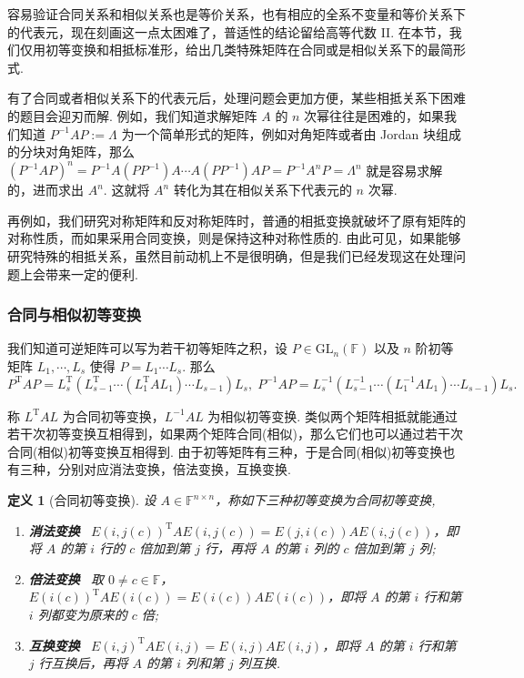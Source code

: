 \documentclass[10pt,openany]{article}
\theoremstyle{thmstyle} %
\theoremstyle{defstyle} %
\newtheorem{definition}[theorem]{定义}
\theoremstyle{prostyle} %
\theoremstyle{exastyle}
\theoremstyle{remstyle}
\newcommand{\T}{^{\text{T}}}
\newcommand{\F}{\mathbb{F}}
\newcommand{\gfn}{\text{GL}_n(\mathbb{F})}
\newcommand{\n}{^{n \times n}}
\begin{document}
容易验证合同关系和相似关系也是等价关系，也有相应的全系不变量和等价关系下的代表元，现在刻画这一点太困难了，普适性的结论留给高等代数 II. 在本节，我们仅用初等变换和相抵标准形，给出几类特殊矩阵在合同或是相似关系下的最简形式. 

有了合同或者相似关系下的代表元后，处理问题会更加方便，某些相抵关系下困难的题目会迎刃而解. 例如，我们知道求解矩阵 \( A \) 的 \( n \) 次幂往往是困难的，如果我们知道 \( P^{-1}AP:=\Lambda \) 为一个简单形式的矩阵，例如对角矩阵或者由 Jordan 块组成的分块对角矩阵，那么 \( (P^{-1}AP)^n=P^{-1}A(PP^{-1})A\cdots A(PP^{-1})AP=P^{-1}A^nP=\Lambda^n \) 就是容易求解的，进而求出 \( A^n \). 这就将 \( A^n \) 转化为其在相似关系下代表元的 \( n \) 次幂.

再例如，我们研究对称矩阵和反对称矩阵时，普通的相抵变换就破坏了原有矩阵的对称性质，而如果采用合同变换，则是保持这种对称性质的. 由此可见，如果能够研究特殊的相抵关系，虽然目前动机上不是很明确，但是我们已经发现这在处理问题上会带来一定的便利.

\subsubsection{合同与相似初等变换}

我们知道可逆矩阵可以写为若干初等矩阵之积，设 \( P \in \gfn \) 以及 \( n \) 阶初等矩阵 \( L_1,\cdots,L_s \) 使得 \( P=L_1\cdots L_s \). 那么
\[ P\T AP=L_s\T(L_{s-1}\T \cdots (L_1\T AL_1) \cdots L_{s-1})L_s, \; P^{-1} AP=L_s^{-1}(L_{s-1}^{-1} \cdots (L_1^{-1} AL_1) \cdots L_{s-1})L_s. \]

称 \( L\T AL \) 为合同初等变换，\( L^{-1}AL \) 为相似初等变换. 类似两个矩阵相抵就能通过若干次初等变换互相得到，如果两个矩阵合同(相似)，那么它们也可以通过若干次合同(相似)初等变换互相得到. 由于初等矩阵有三种，于是合同(相似)初等变换也有三种，分别对应消法变换，倍法变换，互换变换. 

\begin{definition}[合同初等变换]
	设 \( A \in \F\n \)，称如下三种初等变换为合同初等变换,
	\begin{enumerate}[(1)]
		\item \textbf{消法变换} \ \( E(i,j(c))\T A E(i,j(c))= E(j,i(c)) A E(i,j(c)) \)，即将 \( A \) 的第 \( i \) 行的 \( c \) 倍加到第 \( j \) 行，再将 \( A \) 的第 \( i \) 列的 \( c \) 倍加到第 \( j \) 列;
		\item \textbf{倍法变换} \ 取 \( 0 \neq c \in \F \)，\( E(i(c))\T A E(i(c))= E(i(c)) A E(i(c)) \)，即将 \( A \) 的第 \( i \) 行和第 \( i \) 列都变为原来的 \( c \) 倍;
		\item \textbf{互换变换} \ \( E(i,j)\T A E(i,j)= E(i,j) A E(i,j) \)，即将 \( A \) 的第 \( i \) 行和第 \( j \) 行互换后，再将 \( A \) 的第 \( i \) 列和第 \( j \) 列互换.
	\end{enumerate}
\end{definition}
\end{document}
